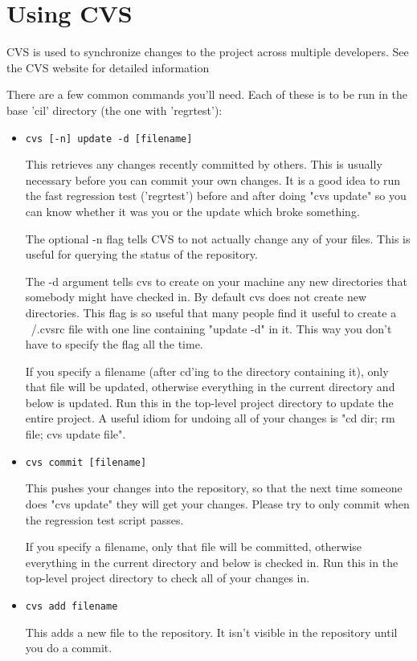 \documentclass{book}
\def\t#1{{\tt #1}}
\begin{document}
 

\chapter{Using CVS}
CVS is used to synchronize changes to the project across multiple
developers.  See the CVS website for detailed information

  
There are a few common commands you'll need.  Each of these is to be run
in the base 'cil' directory (the one with 'regrtest'):

\begin{itemize}
\item \t{cvs [-n] update -d [filename]}

    This retrieves any changes recently committed by others.  This is
    usually necessary before you can commit your own changes.  It is a
    good idea to run the fast regression test ('regrtest') before and
    after doing "cvs update" so you can know whether it was you or the
    update which broke something.

    The optional -n flag tells CVS to not actually change any of your
    files.  This is useful for querying the status of the repository.

    The -d argument tells cvs to create on your machine any new directories
    that somebody might have checked in. By default cvs does not create new
    directories. This flag is so useful that many people find it useful to
    create a ~/.cvsrc file with one line containing "update -d" in it. This way
    you don't have to specify the flag all the time.

    If you specify a filename (after cd'ing to the directory containing it),
    only that file will be updated, otherwise everything in the current
    directory and below is updated. Run this in the top-level project
    directory to update the entire project. A useful idiom for undoing all of
    your changes is "cd dir; rm file; cvs update file".

    
\item \t{cvs commit [filename]}

    This pushes your changes into the repository, so that the next time
    someone does "cvs update" they will get your changes.  Please try to
    only commit when the regression test script passes.
    
    If you specify a filename, only that file will be committed, otherwise
    everything in the current directory and below is checked in. Run this in
    the top-level project directory to check all of your changes in.

\item  \t{cvs add filename}

    This adds a new file to the repository.  It isn't visible in the
    repository until you do a commit.
\end{itemize}
\end{document}
